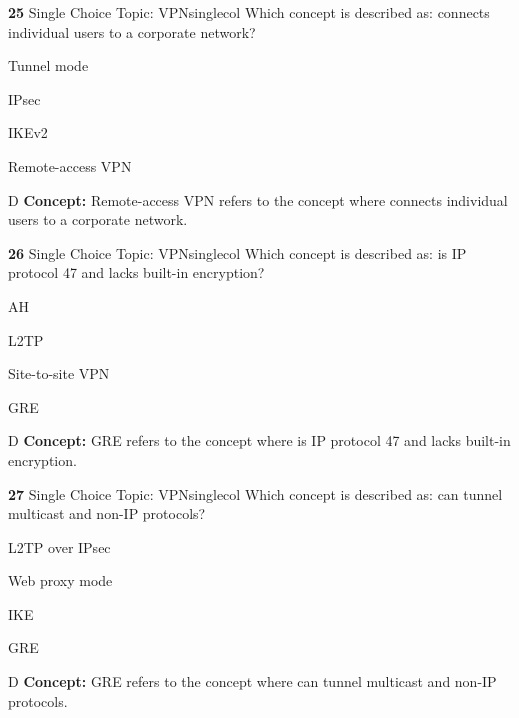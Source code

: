 \documentclass[10pt,a4paper]{article}
\begin{document}
\begin{qcard}{\color{white}\textbf{25} \hfill \small Single Choice \textbar{} Topic: VPN}{singlecol}
Which concept is described as: connects individual users to a corporate network?

\begin{qoptions}
\item Tunnel mode
\item IPsec
\item IKEv2
\item Remote-access VPN
\end{qoptions}
\begin{explainbox}{D}
\textbf{Concept:} Remote-access VPN refers to the concept where connects individual users to a corporate network.
\end{explainbox}
\end{qcard}

\begin{qcard}{\color{white}\textbf{26} \hfill \small Single Choice \textbar{} Topic: VPN}{singlecol}
Which concept is described as: is IP protocol 47 and lacks built-in encryption?

\begin{qoptions}
\item AH
\item L2TP
\item Site-to-site VPN
\item GRE
\end{qoptions}
\begin{explainbox}{D}
\textbf{Concept:} GRE refers to the concept where is IP protocol 47 and lacks built-in encryption.
\end{explainbox}
\end{qcard}

\begin{qcard}{\color{white}\textbf{27} \hfill \small Single Choice \textbar{} Topic: VPN}{singlecol}
Which concept is described as: can tunnel multicast and non-IP protocols?

\begin{qoptions}
\item L2TP over IPsec
\item Web proxy mode
\item IKE
\item GRE
\end{qoptions}
\begin{explainbox}{D}
\textbf{Concept:} GRE refers to the concept where can tunnel multicast and non-IP protocols.
\end{explainbox}
\end{qcard}
\end{document}
